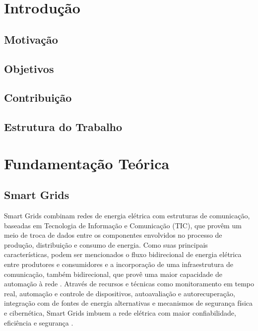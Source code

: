 \documentclass[cic,tc]{iiufrgs}
\begin{document}

\tableofcontents

\chapter{Introdução}
\section{Motivação}
\section{Objetivos}
\section{Contribuição}
\section{Estrutura do Trabalho}
\chapter{Fundamentação Teórica}
\section{Smart Grids}
Smart Grids combinam redes de energia elétrica com estruturas de comunicação, baseadas em Tecnologia de Informação e Comunicação (TIC), que provêm um meio de troca de dados entre os componentes envolvidos no processo de produção, distribuição e consumo de energia. Como suas principais características, podem ser mencionados o fluxo bidirecional de energia elétrica entre produtores e consumidores e a incorporação de uma infraestrutura de comunicação, também bidirecional, que provê uma maior capacidade de automação à rede \cite{2013survey}. Através de recursos e técnicas como monitoramento em tempo real, automação e controle de dispositivos, autoavaliação e autorecuperação, integração com de fontes de energia alternativas e mecanismos de segurança física e cibernética, Smart Grids imbuem a rede elétrica com maior confiabilidade, eficiência e segurança \cite{li2012securing}.
\end{document}
